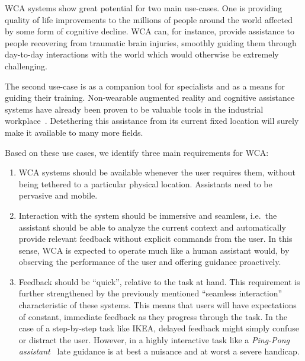 \documentclass[10pt,letterpaper]{article}
\begin{document}
WCA systems show great potential for two main use-cases.
One is providing quality of life improvements to the millions of people around the world affected by some form of cognitive decline. 
WCA can, for instance, provide assistance to people recovering from traumatic brain injuries, smoothly guiding them through day-to-day interactions with the world which would otherwise be extremely challenging. 

The second use-case is as a companion tool for specialists and as a means for guiding their training. 
Non-wearable augmented reality and cognitive assistance systems have already been proven to be valuable tools in the industrial workplace~\autocite{funk2015caworkplace,gorecky2011cognito}.
Detethering this assistance from its current fixed location will surely make it available to many more fields. 

Based on these use cases, we identify three main requirements for WCA:\@
\begin{enumerate}
    \item\label{item:pervasive} WCA systems should be available whenever the user requires them, without being tethered to a particular physical location. Assistants need to be pervasive and mobile.

    \item\label{item:interaction} Interaction with the system should be immersive and seamless, i.e.\ the assistant should be able to analyze the current context and automatically provide relevant feedback without explicit commands from the user.
    In this sense, WCA is expected to operate much like a human assistant would, by observing the performance of the user and offering guidance proactively.

    \item\label{item:lowlatency} Feedback should be ``quick'', relative to the task at hand. 
    This requirement is further strengthened by the previously mentioned ``seamless interaction'' characteristic of these systems.
    This means that users will have expectations of constant, immediate feedback as they progress through the task.
    In the case of a step-by-step task like IKEA, delayed feedback might simply confuse or distract the user.
    However, in a highly interactive task like a \emph{Ping-Pong assistant}~\autocite{PingPongAssistant, Chen:EarlyImplementation} late guidance is at best a nuisance and at worst a severe handicap.
\end{enumerate}
\end{document}
